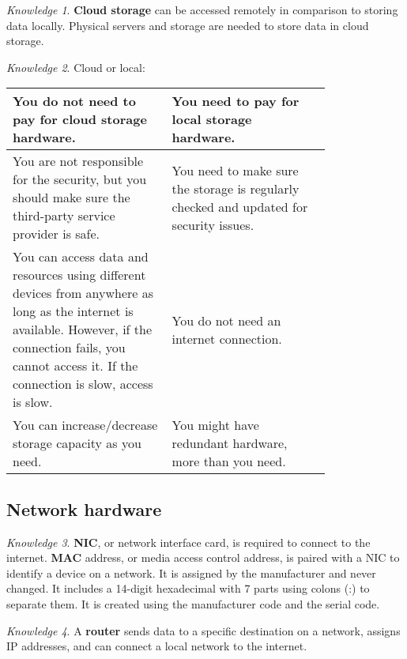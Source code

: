 \documentclass[8pt]{article}
\theoremstyle{remark}
\newtheorem{knowledge}{Knowledge}[subsection]
\begin{document}
            \begin{knowledge}
                \textbf{Cloud storage} can be accessed remotely in comparison to storing data locally. Physical servers and storage are needed to store data in cloud storage.
            \end{knowledge}

            \begin{knowledge}
                Cloud or local:
                \begin{center}
                    \begin{tabular}{p{0.4\linewidth}|p{0.4\linewidth}}
                        You do not need to pay for cloud storage hardware. & You need to pay for local storage hardware.\\\hline
                        You are not responsible for the security, but you should make sure the third-party service provider is safe. & You need to make sure the storage is regularly checked and updated for security issues.\\\hline
                        You can access data and resources using different devices from anywhere as long as the internet is available. However, if the connection fails, you cannot access it. If the connection is slow, access is slow. & You do not need an internet connection.\\\hline
                        You can increase/decrease storage capacity as you need. & You might have redundant hardware, more than you need.
                    \end{tabular}
                \end{center}
            \end{knowledge}

        \subsection{Network hardware}
            \begin{knowledge}
                \textbf{NIC}, or network interface card, is required to connect to the internet. \textbf{MAC} address, or media access control address, is paired with a NIC to identify a device on a network. It is assigned by the manufacturer and never changed. It includes a 14-digit hexadecimal with 7 parts using colons (:) to separate them. It is created using the manufacturer code and the serial code. 
            \end{knowledge}

            \begin{knowledge}
                A \textbf{router} sends data to a specific destination on a network, assigns IP addresses, and can connect a local network to the
                internet.
            \end{knowledge}
\end{document}
